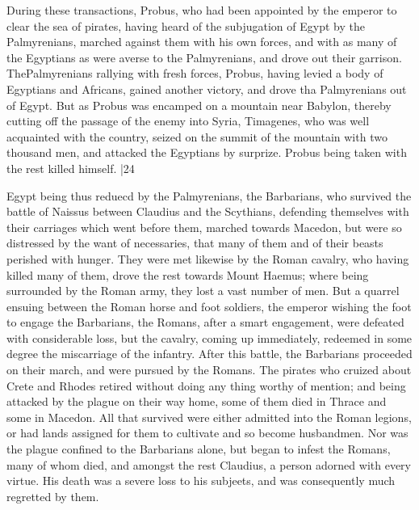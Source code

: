 During these transactions, Probus, who had been appointed by the emperor to clear the sea of pirates, having heard of the subjugation of Egypt by the Palmyrenians, marched against them with his own forces, and with as many of the Egyptians as were averse to the Palmyrenians, and drove out their garrison. The\emph{}Palmyrenians rallying with fresh forces, Probus, having levied a body of Egyptians and Africans, gained another victory, and drove tha Palmyrenians out of Egypt. But as Probus was encamped on a mountain near Babylon, thereby cutting off the passage of the enemy into Syria, Timagenes, who was well acquainted with the country, seized on the summit of the mountain with two thousand men, and attacked the Egyptians by surprize. Probus being taken with the rest killed himself.
|24

Egypt being thus reduecd by the Palmyrenians, the Barbarians, who survived the battle of Naissus between Claudius and the Scythians, defending themselves with their carriages which went before them, marched towards Macedon, but were so distressed by the want of necessaries, that many of them and of their beasts perished with hunger. They were met likewise by the Roman cavalry, who having killed many of them, drove the rest towards Mount Haemus; where being surrounded by the Roman army, they lost a vast number of men. But a quarrel ensuing between the Roman horse and foot soldiers, the emperor wishing the foot to engage the Barbarians, the Romans, after a smart engagement, were defeated with considerable loss, but the cavalry, coming up immediately, redeemed in some degree the miscarriage of the infantry. After this battle, the Barbarians proceeded on their march, and were pursued by the Romans. The pirates who cruized about Crete and Rhodes retired without doing any thing worthy of mention; and being attacked by the plague on their way home, some of them died in Thrace and some in Macedon. All that survived were either admitted into the Roman legions, or had lands assigned for them to cultivate and so become husbandmen. Nor was the plague confined to the Barbarians alone, but began to infest the Romans, many of whom died, and amongst the rest Claudius, a person adorned with every virtue. His death was a severe loss to his subjeets, and was consequently much regretted by them.

